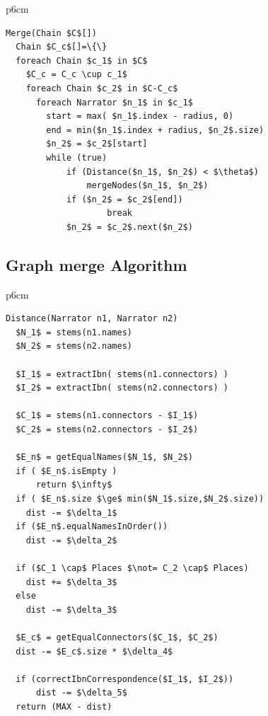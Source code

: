 \documentclass[11pt]{article}
\begin{document}
\begin{table}[tb]
\begin{tabular} {p{6cm}}
\begin{Verbatim}[fontsize=\relsize{-2},
frame=topline,framesep=4mm,label=\fbox{MergeChains algorithm},
commandchars=\\\{\}, codes={\catcode`$=3\catcode`_=8}]
Merge(Chain $C$[])
  Chain $C_c$[]=\{\}
  foreach Chain $c_1$ in $C$ 
    $C_c = C_c \cup c_1$
    foreach Chain $c_2$ in $C-C_c$
      foreach Narrator $n_1$ in $c_1$
        start = max( $n_1$.index - radius, 0)
        end = min($n_1$.index + radius, $n_2$.size)
        $n_2$ = $c_2$[start]
        while (true)
            if (Distance($n_1$, $n_2$) < $\theta$)
                mergeNodes($n_1$, $n_2$)
            if ($n_2$ = $c_2$[end])
                    break
            $n_2$ = $c_2$.next($n_2$)        
\end{Verbatim}
\end{tabular}
\label{a:merge}
\end{table}

\subsection{Graph merge Algorithm}

\begin{table}[tb]
\begin{tabular} {p{6cm}}
\begin{Verbatim}[fontsize=\relsize{-2},
frame=topline,framesep=4mm,label=\fbox{Narrator distance metric },
commandchars=\\\{\}, codes={\catcode`$=3\catcode`_=8}]
Distance(Narrator n1, Narrator n2)
  $N_1$ = stems(n1.names)
  $N_2$ = stems(n2.names)

  $I_1$ = extractIbn( stems(n1.connectors) )
  $I_2$ = extractIbn( stems(n2.connectors) )

  $C_1$ = stems(n1.connectors - $I_1$)
  $C_2$ = stems(n2.connectors - $I_2$)

  $E_n$ = getEqualNames($N_1$, $N_2$)
  if ( $E_n$.isEmpty ) 
      return $\infty$
  if ( $E_n$.size $\ge$ min($N_1$.size,$N_2$.size))
    dist -= $\delta_1$
  if ($E_n$.equalNamesInOrder())  
    dist -= $\delta_2$

  if ($C_1 \cap$ Places $\not= C_2 \cap$ Places)
    dist += $\delta_3$
  else
    dist -= $\delta_3$

  $E_c$ = getEqualConnectors($C_1$, $C_2$)
  dist -= $E_c$.size * $\delta_4$ 

  if (correctIbnCorrespondence($I_1$, $I_2$))
      dist -= $\delta_5$
  return (MAX - dist)
\end{Verbatim}
\end{tabular}
\label{a:distance}
\end{table}
\end{document}
